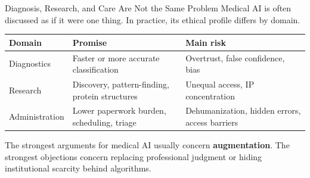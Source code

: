 \documentclass[aspectratio=169,11pt]{beamer}
\begin{document}
\begin{frame}{Diagnosis, Research, and Care Are Not the Same Problem}
Medical AI is often discussed as if it were one thing. In practice, its ethical profile differs by domain.

\vspace{0.2cm}
\begin{table}[h]
\centering
\scriptsize
\begin{tabular}{@{}p{3cm}p{3.5cm}p{4.8cm}@{}}
\toprule
\textbf{Domain} & \textbf{Promise} & \textbf{Main risk} \\
\midrule
Diagnostics & Faster or more accurate classification & Overtrust, false confidence, bias \\
\addlinespace
Research & Discovery, pattern-finding, protein structures & Unequal access, IP concentration \\
\addlinespace
Administration & Lower paperwork burden, scheduling, triage & Dehumanization, hidden errors, access barriers \\
\bottomrule
\end{tabular}
\end{table}

\vspace{0.2cm}
The strongest arguments for medical AI usually concern \textbf{augmentation}. The strongest objections concern replacing professional judgment or hiding institutional scarcity behind algorithms.
\end{frame}
\end{document}
